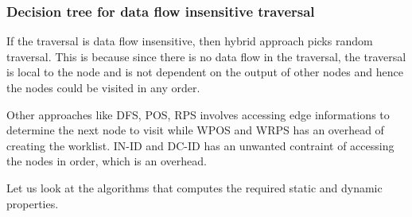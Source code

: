 \subsubsection{Decision tree for data flow insensitive traversal}
If the traversal is data flow insensitive, then hybrid approach picks random
traversal. This is because since there is no data flow in the traversal, the
traversal is local to the node and is not dependent on the output of other nodes
and hence the nodes could be visited in any order.\par Other approaches like
DFS, POS, RPS involves accessing edge informations to determine the next node to
visit while WPOS and WRPS has an overhead of creating the worklist. IN-ID and
DC-ID has an unwanted contraint of accessing the nodes in order, which is an
overhead.\par Let us look at the algorithms that computes the required static
and dynamic properties.

